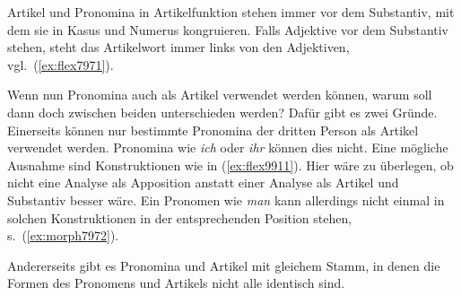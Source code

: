Artikel und Pronomina in Artikelfunktion stehen immer vor dem Substantiv, mit dem sie in Kasus und Numerus kongruieren.
Falls Adjektive vor dem Substantiv stehen, steht das Artikelwort immer links von den Adjektiven, vgl.\ (\ref{ex:flex7971}).

\begin{exe}
  \ex \label{ex:flex7971}
  \begin{xlist}
  \end{xlist}
\end{exe}


\Enl[1]

Wenn nun Pronomina auch als Artikel verwendet werden können, warum soll dann doch zwischen beiden unterschieden werden?
Dafür gibt es zwei Gründe.
Einerseits können nur bestimmte Pronomina der dritten Person als Artikel verwendet werden.
Pronomina wie \textit{ich} oder \textit{ihr} können dies \zB nicht.
Eine mögliche Ausnahme sind Konstruktionen wie in (\ref{ex:flex9911}).
Hier wäre zu überlegen, ob nicht eine Analyse als Apposition anstatt einer Analyse als Artikel und Substantiv besser wäre.
Ein Pronomen wie \textit{man} kann allerdings nicht einmal in solchen Konstruktionen in der entsprechenden Position stehen, s.\ (\ref{ex:morph7972}).

\begin{exe}
  \ex\label{ex:flex9911}
  \begin{xlist}
  \end{xlist}
  \ex \label{ex:morph7972}
  \begin{xlist}
  \end{xlist}
\end{exe}

Andererseits gibt es Pronomina und Artikel mit gleichem Stamm, in denen die Formen des Pronomens und Artikels nicht alle identisch sind.

\begin{exe}
  \ex \label{ex:flex7973}
  \begin{xlist}
  \end{xlist}
  \ex \label{ex:flex7974}
  \begin{xlist}
  \end{xlist}
  \ex \label{ex:flex7975}
  \begin{xlist}
  \end{xlist}
\end{exe}

